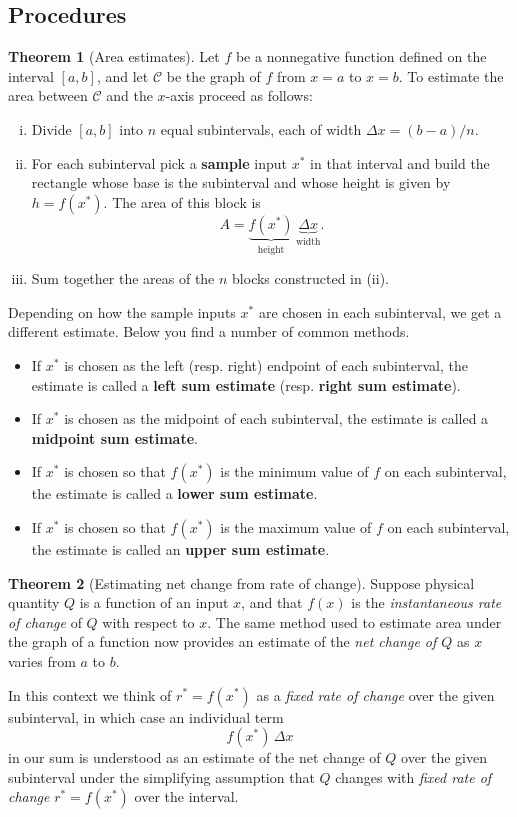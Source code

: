 \documentclass[11pt]{article}
\theoremstyle{definition}
\theoremstyle{named}
\newtheorem*{namedtheorem}{Theorem}
\numberwithin{myalgctr}{section}
\begin{document}
\thispagestyle{fancy}

\subsection*{Procedures}
\begin{namedtheorem}[Area estimates] Let $f$ be a nonnegative function defined on the interval $[a,b]$, and let $\mathcal{C}$ be the graph of $f$ from $x=a$ to $x=b$. To estimate the area between $\mathcal{C}$ and the $x$-axis proceed as follows:
  \begin{enumerate}[(i),itemsep=0pt,topsep=0pt]
    \item Divide $[a,b]$ into $n$ equal subintervals, each of width $\Delta x=(b-a)/n$.
    \item For each subinterval pick a {\bf sample} input $x^*$ in that interval and build the rectangle whose base is the subinterval and whose height is given by $h=f(x^*)$. The area of this block is
    \[
    A=\underset{\text{height}}{\underbrace{f(x^*)}}\,\underset{\text{width}}{\underbrace{\Delta x}}.
    \]
    \item Sum together the areas of the $n$ blocks constructed in (ii).
  \end{enumerate}
Depending on how the sample inputs $x^*$ are chosen in each subinterval, we get a different estimate. Below you find a number of  common methods.
\begin{itemize}[itemsep=0pt, topsep=0pt]
  \item If $x^*$ is chosen as the left (resp. right) endpoint of each subinterval, the estimate is called a {\bf left sum estimate} (resp. {\bf right sum estimate}).
  \item If $x^*$ is chosen as the midpoint of each subinterval, the estimate is called a {\bf midpoint sum estimate}.
  \item If $x^*$ is chosen so that $f(x^*)$ is the minimum value of $f$ on each subinterval, the estimate is called a {\bf lower sum estimate}.
  \item If $x^*$ is chosen so that $f(x^*)$ is the maximum value of $f$ on each subinterval, the estimate is called an {\bf upper sum estimate}.

\end{itemize}

\end{namedtheorem}
\begin{namedtheorem}[Estimating net change from rate of change] Suppose physical quantity $Q$ is a function of an input $x$, and that $f(x)$ is the {\em instantaneous rate of change} of $Q$ with respect to $x$. The same method used to estimate area under the graph of a function now provides an estimate of the {\em net change of $Q$} as $x$ varies from $a$ to $b$.

\noindent
In this context we think of $r^*=f(x^*)$ as a {\em fixed rate of change} over the given subinterval, in which case an individual term
\[
f(x^*)\, \Delta x
\]
in our sum is understood as an estimate of the net change of $Q$ over the given subinterval under the simplifying assumption that $Q$ changes with {\em fixed rate of change} $r^*=f(x^*)$ over the interval.

\end{namedtheorem}
\end{document}
